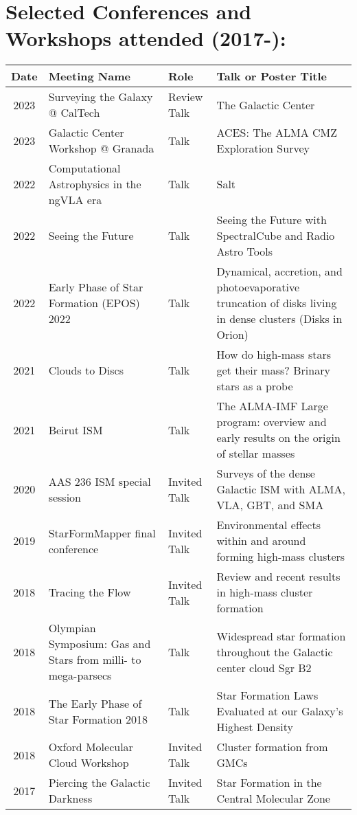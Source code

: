 \clearpage
\setlength{\extrarowheight}{4pt}
\section*{Selected Conferences and Workshops attended (2017-): }
\vspace{-12pt}
\begin{tabular}{cp{1.8in}p{1.5cm}p{3.0in}}
    Date & Meeting Name & Role & Talk or Poster Title \\
                \hline
    2023 &      Surveying the Galaxy @ CalTech & Review Talk & The Galactic Center \\
    2023 &      Galactic Center Workshop @ Granada & Talk & ACES: The ALMA CMZ Exploration Survey \\
    2022 &      Computational Astrophysics in the ngVLA era & Talk & Salt \\
    2022 &      Seeing the Future & Talk & Seeing the Future with SpectralCube and Radio Astro Tools \\
    2022 &      Early Phase of Star Formation (EPOS) 2022 & Talk &  Dynamical, accretion, and photoevaporative truncation of disks living in dense clusters (Disks in Orion)\\
    2021 &      Clouds to Discs & Talk & How do high-mass stars get their mass? Brinary stars as a probe \\
    2021 &      Beirut ISM & Talk & The ALMA-IMF Large program: overview and early results on the origin of stellar masses \\
    2020 &      AAS 236 ISM special session & Invited Talk &  Surveys of the dense Galactic ISM with ALMA, VLA, GBT, and SMA \\
    2019 &      StarFormMapper final conference & Invited Talk & Environmental effects within and around forming high-mass clusters \\
    2018 &      Tracing the Flow & Invited Talk & Review and recent results in high-mass cluster formation \\
    2018 &      Olympian Symposium: Gas and Stars from milli- to mega-parsecs & Talk & 	Widespread star formation throughout the Galactic center cloud Sgr B2 \\
    2018 &      The Early Phase of Star Formation 2018 & Talk & Star Formation Laws Evaluated at our Galaxy's Highest Density \\
    2018 &      Oxford Molecular Cloud Workshop & Invited Talk & Cluster formation from GMCs \\
    2017 &      Piercing the Galactic Darkness & Invited Talk & Star Formation in the Central Molecular Zone \\

\end{tabular}
